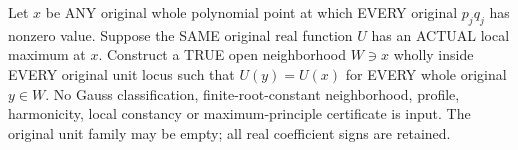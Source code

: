 \begin{theorem}
\label{analytic:actual-original-unit-max-all-point-local-constancy}
\leanok
{}
Let $x$ be ANY original whole polynomial point at which EVERY original
$p_jq_j$ has nonzero value. Suppose the SAME original real function $U$
has an ACTUAL local maximum at $x$. Construct a TRUE open neighborhood
$W\ni x$ wholly inside EVERY original unit locus such that
$U(y)=U(x)$ for EVERY whole original $y\in W$.
No Gauss classification, finite-root-constant neighborhood, profile,
harmonicity, local constancy or maximum-principle certificate is input.
The original unit family may be empty; all real coefficient signs are retained.
\end{theorem}
